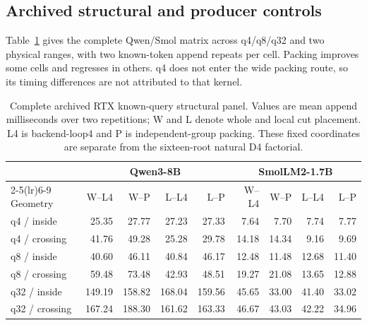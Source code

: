 \subsection{Archived structural and producer controls}
\label{supp:archive}
Table~\ref{tab:all-rtx-cells} gives the complete Qwen/Smol matrix across q4/q8/q32 and two physical ranges, with two known-token append repeats per cell. Packing improves some cells and regresses in others. q4 does not enter the wide packing route, so its timing differences are not attributed to that kernel.

\begin{table}[t]
\centering\footnotesize\tighttable
\caption{Complete archived RTX known-query structural panel. Values are mean append milliseconds over two repetitions; W and L denote whole and local cut placement. L4 is backend-loop4 and P is independent-group packing. These fixed coordinates are separate from the sixteen-root natural D4 factorial.}
\label{tab:all-rtx-cells}
\begin{tabular}{@{}lrrrrrrrr@{}}\toprule
 & \multicolumn{4}{c}{Qwen3-8B} & \multicolumn{4}{c}{SmolLM2-1.7B}\\
\cmidrule(lr){2-5}\cmidrule(lr){6-9}
Geometry & W--L4 & W--P & L--L4 & L--P & W--L4 & W--P & L--L4 & L--P\\\midrule
q4 / inside & 25.35 & 27.77 & 27.23 & 27.33 & 7.64 & 7.70 & 7.74 & 7.77 \\
q4 / crossing & 41.76 & 49.28 & 25.28 & 29.78 & 14.18 & 14.34 & 9.16 & 9.69 \\
q8 / inside & 40.60 & 46.11 & 40.84 & 46.17 & 12.48 & 11.48 & 12.68 & 11.40 \\
q8 / crossing & 59.48 & 73.48 & 42.93 & 48.51 & 19.27 & 21.08 & 13.65 & 12.88 \\
q32 / inside & 149.19 & 158.82 & 168.04 & 159.56 & 45.65 & 33.00 & 41.40 & 33.02 \\
q32 / crossing & 167.24 & 188.30 & 161.62 & 163.33 & 46.67 & 43.03 & 42.22 & 34.96 \\
\bottomrule\end{tabular}
\end{table}

